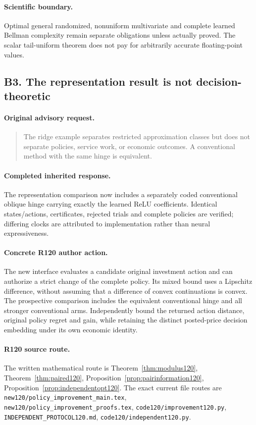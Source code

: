 \paragraph{Scientific boundary.}
Optimal general randomized, nonuniform multivariate and complete learned Bellman complexity remain separate obligations unless actually proved. The scalar tail-uniform theorem does not pay for arbitrarily accurate floating-point values.

\subsection{B3. The representation result is not decision-theoretic}
\label{response120:B3}
\paragraph{Original advisory request.}
\begin{quote}
The ridge example separates restricted approximation classes but does not separate policies, service work, or economic outcomes. A conventional method with the same hinge is equivalent.
\end{quote}
\paragraph{Completed inherited response.}
The representation comparison now includes a separately coded conventional oblique hinge carrying exactly the learned ReLU coefficients. Identical states/actions, certificates, rejected trials and complete policies are verified; differing clocks are attributed to implementation rather than neural expressiveness.
\paragraph{Concrete R120 author action.}
The new interface evaluates a candidate original investment action and can authorize a strict change of the complete policy. Its mixed bound uses a Lipschitz difference, without assuming that a difference of convex continuations is convex. The prospective comparison includes the equivalent conventional hinge and all stronger conventional arms. Independently bound the returned action distance, original policy regret and gain, while retaining the distinct posted-price decision embedding under its own economic identity.
\paragraph{R120 source route.}
The written mathematical route is Theorem~\ref{thm:modulus120}, Theorem~\ref{thm:paired120}, Proposition~\ref{prop:pairinformation120}, Proposition~\ref{prop:independentopt120}. The exact current file routes are \nolinkurl{new120/policy_improvement_main.tex}, \nolinkurl{new120/policy_improvement_proofs.tex}, \nolinkurl{code120/improvement120.py}, \nolinkurl{INDEPENDENT_PROTOCOL120.md}, \nolinkurl{code120/independent120.py}.
